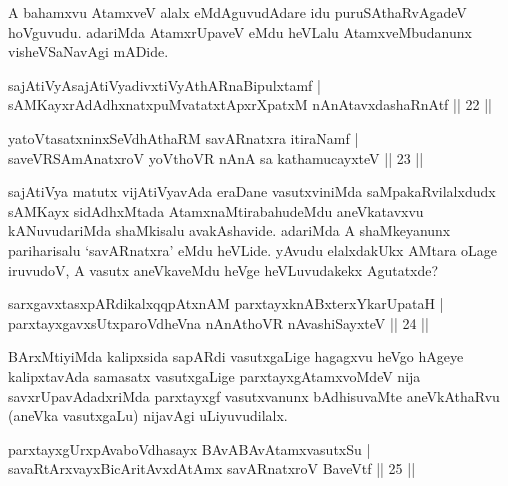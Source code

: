 \begin{artha}
A bahamxvu AtamxveV alalx eMdAguvudAdare idu puruSAthaRvAgadeV hoVguvudu. adariMda AtamxrUpaveV eMdu heVLalu 
AtamxveMbudanunx visheVSaNavAgi mADide.
\end{artha}


\begin{shl}
sajAtiVyAsajAtiVyadivxtiVyAthARnaBipulxtamf |\\
sAMKayxrAdAdhxnatxpuMvatatxtApxrXpatxM nAnAtavxdashaRnAtf \hfill || 22 ||
\end{shl}

\begin{shl}
yatoV\s tasatxninxSeVdhAthaRM savARnatxra itiraNamf |\\
saveVRSAmAnatxroV yoV\s thoVR nAnA sa kathamucayxteV \hfill || 23 ||
\end{shl}

\begin{artha}
sajAtiVya matutx vijAtiVyavAda eraDane vasutxviniMda saMpakaRvilalxdudx sAMKayx sidAdhxMtada AtamxnaMtirabahudeMdu
aneVkatavxvu kANuvudariMda shaMkisalu avakAshavide. adariMda A shaMkeyanunx pariharisalu `savARnatxra' eMdu heVLide. yAvudu elalxdakUkx AMtara oLage iruvudoV, A vasutx aneVkaveMdu heVge heVLuvudakekx Agutatxde?
\end{artha}


\begin{shl}
sarxgavxtasxpARdikalxqqpAtxnAM parxtayxknABxterxYkarUpataH |\\
parxtayxgavxsUtxparoVdheVna nAnAthoVR nAvashiSayxteV \hfill || 24 ||
\end{shl}

\begin{artha}%
BArxMtiyiMda kalipxsida sapARdi vasutxgaLige hagagxvu heVgo hAgeye kalipxtavAda samasatx vasutxgaLige parxtayxgAtamxvoMdeV nija savxrUpavAdadxriMda parxtayxgf vasutxvanunx bAdhisuvaMte aneVkAthaRvu (aneVka vasutxgaLu) nijavAgi uLiyuvudilalx.
\end{artha}


\begin{shl}
parxtayxgUrxpAvaboVdhasayx BAvABAvAtamxvasutxSu |\\
savaRtArxvayxBicAritAvxdAtAmx savARnatxroV BaveVtf \hfill || 25 ||
\end{shl}

